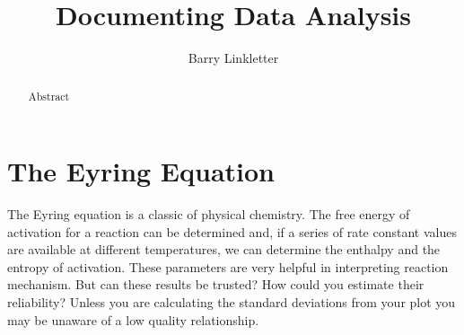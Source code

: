 \documentclass{tufte-handout}
\title{Documenting Data Analysis}
\author[Barry Linkletter]{Barry Linkletter}
\date{} %
\begin{document}
\justifying


\maketitle%

\begin{abstract}
Abstract
\noindent {}

\end{abstract}


\section{The Eyring Equation}

The Eyring equation is a classic of physical chemistry.
 The free energy of activation for a reaction can be determined and, if a series of rate constant values are available at different temperatures, we can determine the enthalpy and the entropy of activation. These parameters are very helpful in interpreting reaction mechanism. But can these results be trusted? How could you estimate their reliability? Unless you are calculating the standard deviations from your plot you may be unaware of a low quality relationship.
\end{document}
